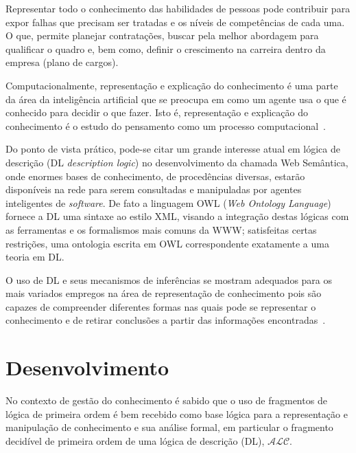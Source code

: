 \documentclass[hyphens,11pt,a4paper]{article}
\newcommand{\alc}{\ensuremath{\mathcal{ALC}}}
\begin{document}
Representar todo o conhecimento das habilidades de pessoas pode contribuir para expor falhas que precisam ser tratadas e os níveis de competências de cada uma. O que, permite planejar contratações, buscar pela melhor abordagem para qualificar o quadro e, bem como, definir o crescimento na carreira dentro da empresa (plano de cargos).

Computacionalmente, representação e explicação do conhecimento é uma parte da área da inteligência artificial que se preocupa em como um agente usa o que é conhecido para decidir o que fazer. Isto é, representação e explicação do conhecimento é o estudo do pensamento como um processo computacional~\cite{brachman2004knowledge}.


Do ponto de vista prático, pode-se citar um grande interesse atual em lógica de descrição (DL \emph{description logic}) no desenvolvimento da chamada Web Semântica, onde enormes bases de conhecimento, de procedências diversas, estarão disponíveis na rede para serem consultadas e manipuladas por agentes inteligentes de \emph{software}. De fato a linguagem OWL (\emph{Web Ontology Language}) fornece a DL uma sintaxe ao estilo XML, visando a integração destas lógicas com as ferramentas e os formalismos mais comuns da WWW; satisfeitas certas restrições, uma ontologia escrita em OWL correspondente exatamente a uma teoria em DL.


O uso de DL e seus mecanismos de inferências se mostram adequados para os mais variados empregos na área de representação de conhecimento pois são capazes de compreender diferentes formas nas quais pode se representar o conhecimento e de retirar conclusões a partir das informações encontradas~\cite{AOW07}.


\section{Desenvolvimento}
No contexto de gestão do conhecimento é sabido que o uso de fragmentos de lógica de primeira ordem é bem recebido como base lógica para a representação e manipulação de conhecimento e sua análise formal, em particular o fragmento decidível de primeira ordem de uma lógica de descrição (DL), \alc.
\end{document}
